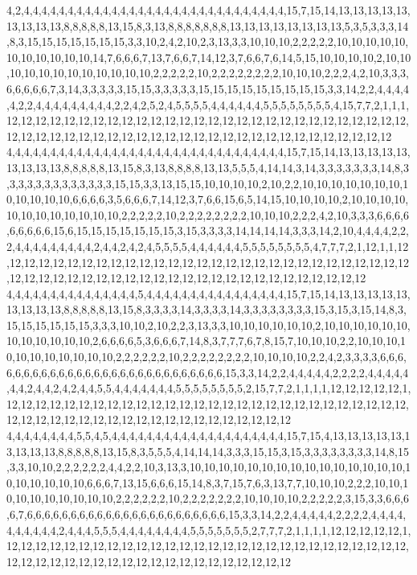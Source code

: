 4,2,4,4,4,4,4,4,4,4,4,4,4,4,4,4,4,4,4,4,4,4,4,4,4,4,4,4,4,4,4,4,15,7,15,14,13,13,13,13,13,13,13,13,13,8,8,8,8,8,13,15,8,3,13,8,8,8,8,8,8,8,13,13,13,13,13,13,13,13,5,3,5,3,3,3,14,8,3,15,15,15,15,15,15,15,3,3,10,2,4,2,10,2,3,13,3,3,10,10,10,2,2,2,2,2,10,10,10,10,10,10,10,10,10,10,10,14,7,6,6,6,7,13,7,6,6,7,14,12,3,7,6,6,7,6,14,5,15,10,10,10,10,2,10,10,10,10,10,10,10,10,10,10,10,10,2,2,2,2,2,10,2,2,2,2,2,2,2,2,10,10,10,2,2,2,4,2,10,3,3,3,6,6,6,6,6,7,3,14,3,3,3,3,3,15,15,3,3,3,3,3,15,15,15,15,15,15,15,15,15,3,3,14,2,2,4,4,4,4,4,2,2,4,4,4,4,4,4,4,4,4,2,2,4,2,5,2,4,5,5,5,5,4,4,4,4,4,4,5,5,5,5,5,5,5,5,4,15,7,7,2,1,1,1,12,12,12,12,12,12,12,12,12,12,12,12,12,12,12,12,12,12,12,12,12,12,12,12,12,12,12,12,12,12,12,12,12,12,12,12,12,12,12,12,12,12,12,12,12,12,12,12,12,12,12,12,12,12,12
4,4,4,4,4,4,4,4,4,4,4,4,4,4,4,4,4,4,4,4,4,4,4,4,4,4,4,4,4,4,4,4,15,7,15,14,13,13,13,13,13,13,13,13,13,8,8,8,8,8,13,15,8,3,13,8,8,8,8,13,13,5,5,5,4,14,14,3,14,3,3,3,3,3,3,3,14,8,3,3,3,3,3,3,3,3,3,3,3,3,3,15,15,3,3,13,15,15,10,10,10,10,2,10,2,2,10,10,10,10,10,10,10,10,10,10,10,10,6,6,6,6,3,5,6,6,6,7,14,12,3,7,6,6,15,6,5,14,15,10,10,10,10,2,10,10,10,10,10,10,10,10,10,10,10,10,2,2,2,2,2,10,2,2,2,2,2,2,2,2,10,10,10,2,2,2,4,2,10,3,3,3,6,6,6,6,6,6,6,6,6,15,6,15,15,15,15,15,15,15,3,15,3,3,3,3,14,14,14,14,3,3,3,14,2,10,4,4,4,4,2,2,2,4,4,4,4,4,4,4,4,4,2,4,4,2,4,2,4,5,5,5,5,4,4,4,4,4,4,5,5,5,5,5,5,5,5,4,7,7,7,2,1,12,1,1,12,12,12,12,12,12,12,12,12,12,12,12,12,12,12,12,12,12,12,12,12,12,12,12,12,12,12,12,12,12,12,12,12,12,12,12,12,12,12,12,12,12,12,12,12,12,12,12,12,12,12,12,12,12
4,4,4,4,4,4,4,4,4,4,4,4,4,4,4,5,4,4,4,4,4,4,4,4,4,4,4,4,4,4,4,4,15,7,15,14,13,13,13,13,13,13,13,13,13,8,8,8,8,8,13,15,8,3,3,3,3,14,3,3,3,3,14,3,3,3,3,3,3,3,3,15,3,15,3,15,14,8,3,15,15,15,15,15,15,3,3,3,10,10,2,10,2,2,3,13,3,3,10,10,10,10,10,10,2,10,10,10,10,10,10,10,10,10,10,10,10,2,6,6,6,6,5,3,6,6,6,7,14,8,3,7,7,7,6,7,8,15,7,10,10,10,2,2,10,10,10,10,10,10,10,10,10,10,10,2,2,2,2,2,2,10,2,2,2,2,2,2,2,2,10,10,10,10,2,2,4,2,3,3,3,3,6,6,6,6,6,6,6,6,6,6,6,6,6,6,6,6,6,6,6,6,6,6,6,6,6,6,6,6,15,3,3,14,2,2,4,4,4,4,4,2,2,2,2,4,4,4,4,4,4,4,2,4,4,2,4,2,4,4,5,5,4,4,4,4,4,4,4,5,5,5,5,5,5,5,5,2,15,7,7,2,1,1,1,1,12,12,12,12,12,1,12,12,12,12,12,12,12,12,12,12,12,12,12,12,12,12,12,12,12,12,12,12,12,12,12,12,12,12,12,12,12,12,12,12,12,12,12,12,12,12,12,12,12,12,12,12,12,12
4,4,4,4,4,4,4,4,5,5,4,5,4,4,4,4,4,4,4,4,4,4,4,4,4,4,4,4,4,4,4,4,15,7,15,4,13,13,13,13,13,13,13,13,13,8,8,8,8,8,13,15,8,3,5,5,5,4,14,14,14,3,3,3,15,15,3,15,3,3,3,3,3,3,3,3,14,8,15,3,3,10,10,2,2,2,2,2,2,4,4,2,2,10,3,13,3,10,10,10,10,10,10,10,10,10,10,10,10,10,10,10,10,10,10,10,10,10,6,6,6,7,13,15,6,6,6,15,14,8,3,7,15,7,6,3,13,7,7,10,10,10,2,2,2,10,10,10,10,10,10,10,10,10,10,2,2,2,2,2,2,10,2,2,2,2,2,2,2,10,10,10,10,2,2,2,2,2,3,15,3,3,6,6,6,6,7,6,6,6,6,6,6,6,6,6,6,6,6,6,6,6,6,6,6,6,6,6,6,6,15,3,3,14,2,2,4,4,4,4,4,2,2,2,2,4,4,4,4,4,4,4,4,4,4,2,4,4,4,5,5,5,4,4,4,4,4,4,4,4,5,5,5,5,5,5,5,2,7,7,7,2,1,1,1,1,12,12,12,12,12,1,12,12,12,12,12,12,12,12,12,12,12,12,12,12,12,12,12,12,12,12,12,12,12,12,12,12,12,12,12,12,12,12,12,12,12,12,12,12,12,12,12,12,12,12,12,12,12,12
